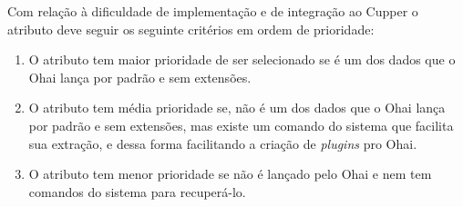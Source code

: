 Com relação à dificuldade de implementação e de integração ao Cupper o
atributo deve seguir os seguinte critérios em ordem de prioridade:

\begin{enumerate}
\item O atributo tem maior prioridade de ser selecionado se é um dos dados 
que o Ohai lança por padrão e sem extensões.
\item O atributo tem média prioridade se, não é um dos dados que o Ohai
lança por padrão e sem extensões, mas existe um comando do sistema que facilita 
sua extração, e dessa forma facilitando a criação de \textit{plugins} pro 
Ohai.
\item O atributo tem menor prioridade se não é lançado pelo Ohai e nem tem 
comandos do sistema para recuperá-lo.
\end{enumerate}

